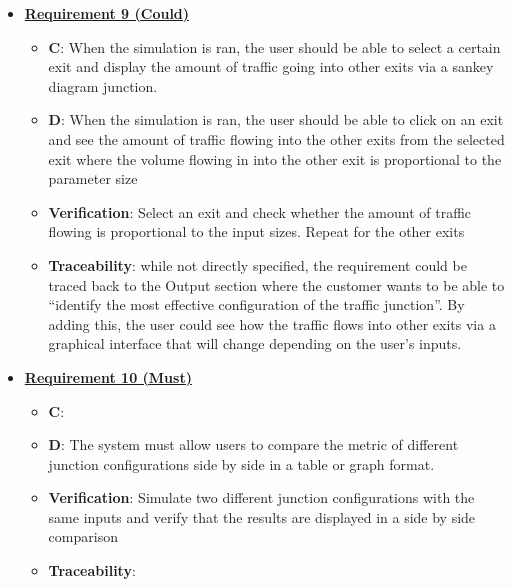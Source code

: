 \documentclass{article}
\begin{document}
\begin{itemize}
    \item \textbf{\underline{Requirement 9 (Could)}}
    \begin{itemize}
        \item \textbf{C}: When the simulation is ran, the user should be able to select a certain exit 
            and display the amount of traffic going into other exits via a 
            sankey diagram junction.
        \item \textbf{D}: When the simulation is ran, the user should be able to click on an exit and see 
            the amount of traffic flowing into the other exits from the selected exit where the volume 
            flowing in into the other exit is proportional to the parameter size
        \item \textbf{Verification}: Select an exit and check whether the amount of traffic flowing 
            is proportional to the input sizes. Repeat for the other exits
        \item\textbf{Traceability}: while not directly specified, the requirement could be traced back 
            to the Output section where the customer wants to be able to “identify the most effective 
            configuration of the traffic junction”. By adding this, the user could see how the traffic 
            flows into other exits via a graphical interface that will change depending on the user's 
            inputs.
    \end{itemize}

    \item \textbf{\underline{Requirement 10 (Must)}}
    \begin{itemize}
        \item \textbf{C}: 
        \item \textbf{D}: The system must allow users to compare the metric of different junction 
            configurations side by side in a table or graph format.
        \item \textbf{Verification}: Simulate two different junction configurations with the same 
            inputs and verify that the results are displayed in a side by side comparison
        \item\textbf{Traceability}: 
    \end{itemize}


\end{itemize}
\end{document}
